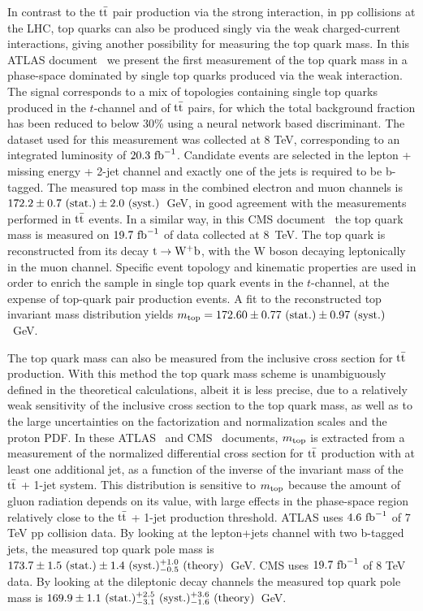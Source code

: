 \documentclass{blois}
\begin{document}
In contrast to the ${\rm t{\bar t}}$ pair production via the strong
interaction, in pp collisions at the LHC, top quarks can also be produced singly
via the weak charged-current interactions, giving another possibility for
measuring the top quark mass. In this ATLAS document~\cite{ref:ATLAS-singleTop8TeV}
we present the first measurement of the top quark mass in a phase-space
dominated by single top quarks produced via the weak interaction. The signal
corresponds to a mix of topologies containing single top quarks produced in the
$t$-channel and of ${\rm t{\bar t}}$ pairs, for which the total background
fraction has been reduced to below 30\% using a neural network based discriminant.
The dataset used for this measurement was collected at 8 TeV, corresponding to an
integrated luminosity of
$20.3~{\rm fb}^{-1}$. Candidate events are selected in the lepton + missing
energy + 2-jet channel and exactly one of the jets is required to be b-tagged.
The measured top mass in the combined electron and muon channels is
$172.2 \pm 0.7~({\rm stat.}) \pm 2.0~({\rm syst.})$~GeV, in good agreement
with the measurements performed in ${\rm t{\bar t}}$ events. In a similar way,
in this CMS document~\cite{ref:CMS-singleTop8TeV} the top quark mass is
measured on $19.7~{\rm fb}^{-1}$ of data collected at 8~TeV. The top quark is
reconstructed from its decay ${\rm t\to W^+b}$, with the W boson decaying
leptonically in the muon channel. Specific event topology and kinematic 
properties are used in order to enrich the sample in single top quark events
in the $t$-channel, at the expense of top-quark pair production events. A fit
to the reconstructed top invariant mass distribution yields
$m_{\rm top} = 172.60 \pm 0.77~({\rm stat.}) \pm 0.97~({\rm syst.})$~GeV.

The top quark mass can also be measured from the inclusive cross section for
${\rm t{\bar t}}$ production. With this method the top quark mass scheme is
unambiguously defined in the theoretical calculations, albeit it is less precise,
due to a relatively weak sensitivity of the inclusive cross section to the
top quark mass, as well as to the large uncertainties on the factorization and
normalization scales and the proton PDF. In these
ATLAS~\cite{ref:ATLAS-topPoleMass} and CMS~\cite{ref:CMS-topPoleMass} documents,
$m_{\rm top}$ is extracted from a measurement of the normalized differential
cross section for ${\rm t{\bar t}}$ production with at least one additional
jet, as a function of the inverse of the invariant mass of the
${\rm t{\bar t}}$ + 1-jet system. This distribution is sensitive to
$m_{\rm top}$ because the amount of gluon radiation depends on its value,
with large effects in the phase-space region relatively close to the
${\rm t{\bar t}}$ + 1-jet production threshold. ATLAS uses $4.6~{\rm fb}^{-1}$ of
7 TeV pp collision data. By looking at the lepton+jets channel with two
b-tagged jets, the measured top quark pole mass is
$173.7 \pm 1.5~({\rm stat.}) \pm 1.4~({\rm syst.})^{+1.0}_{-0.5}~({\rm theory})$~GeV.
CMS uses $19.7~{\rm fb}^{-1}$ of 8 TeV data. By looking at the dileptonic decay
channels the measured top quark pole mass is
$169.9 \pm 1.1~({\rm stat.})^{+2.5}_{-3.1}~({\rm syst.})^{+3.6}_{-1.6}~({\rm theory})$~GeV.
\end{document}
